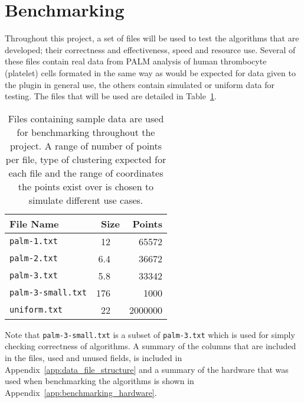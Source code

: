 
\section{Benchmarking}
\label{sec:benchmarking}

Throughout this project, a set of files will be used to test the algorithms
that are developed; their correctness and effectiveness, speed and resource
use.  Several of these files contain real data from PALM analysis of human
thrombocyte (platelet) cells formated in the same way as would be expected for
data given to the plugin in general use, the others contain simulated or
uniform data for testing. The files that will be used are detailed in
Table~\ref{tab:benchmarking-files}.

\renewcommand{\arraystretch}{1.3}
\begin{table}[htbp]
\centering
\begin{tabular} {l r r}
	\toprule
	File Name & Size & Points \\
	\midrule
	\texttt{palm-1.txt} & \SI{12}{\mebi\byte} & 65572 \\
	\texttt{palm-2.txt} & \SI{6.4}{\mebi\byte} & 36672 \\
	\texttt{palm-3.txt} & \SI{5.8}{\mebi\byte} & 33342 \\
	\texttt{palm-3-small.txt} & \SI{176}{\kibi\byte} & 1000 \\
	\texttt{uniform.txt} & \SI{22}{\mebi\byte} & 2000000 \\
	\bottomrule
\end{tabular}

\caption[Sample data files used for testing and benchmarking.]{Files containing
	sample data are used for benchmarking throughout the project. A range of
	number of points per file, type of clustering expected for each file and
	the range of coordinates the points exist over is chosen to simulate
	different use cases.}\label{tab:benchmarking-files}
\end{table}

Note that \texttt{palm-3-small.txt} is a subset of \texttt{palm-3.txt} which
is used for simply checking correctness of algorithms. A summary of the
columns that are included in the files, used and unused fields, is included in
Appendix~\ref{app:data_file_structure} and a summary of the hardware that was
used when benchmarking the algorithms is shown in
Appendix~\ref{app:benchmarking_hardware}.
